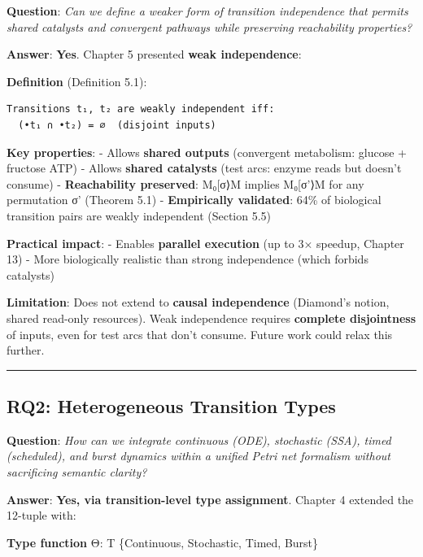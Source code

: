 \textbf{Question}: \emph{Can we define a weaker form of transition
independence that permits shared catalysts and convergent pathways while
preserving reachability properties?}

\textbf{Answer}: \textbf{Yes}. Chapter 5 presented \textbf{weak
independence}:

\textbf{Definition} (Definition 5.1):

\begin{lstlisting}
Transitions t₁, t₂ are weakly independent iff:
  (•t₁ ∩ •t₂) = ∅  (disjoint inputs)
\end{lstlisting}

\textbf{Key properties}: - Allows \textbf{shared outputs} (convergent
metabolism: glucose + fructose \textrightarrow ATP) - Allows \textbf{shared catalysts}
(test arcs: enzyme reads but doesn't consume) - \textbf{Reachability
preserved}: M₀{[}σ⟩M implies M₀{[}σ'⟩M for any permutation σ' (Theorem
5.1) - \textbf{Empirically validated}: 64\% of biological transition
pairs are weakly independent (Section 5.5)

\textbf{Practical impact}: - Enables \textbf{parallel execution} (up to
3× speedup, Chapter 13) - More biologically realistic than strong
independence (which forbids catalysts)

\textbf{Limitation}: Does not extend to \textbf{causal independence}
(Diamond's notion, shared read-only resources). Weak independence
requires \textbf{complete disjointness} of inputs, even for test arcs
that don't consume. Future work could relax this further.

\begin{center}\rule{0.5\linewidth}{0.5pt}\end{center}

\hypertarget{rq2-heterogeneous-transition-types}{%
\subsection{RQ2: Heterogeneous Transition
Types}\label{rq2-heterogeneous-transition-types}}

\textbf{Question}: \emph{How can we integrate continuous (ODE),
stochastic (SSA), timed (scheduled), and burst dynamics within a unified
Petri net formalism without sacrificing semantic clarity?}

\textbf{Answer}: \textbf{Yes, via transition-level type assignment}.
Chapter 4 extended the 12-tuple with:

\textbf{Type function} Θ: T \textrightarrow \{Continuous, Stochastic, Timed, Burst\}

